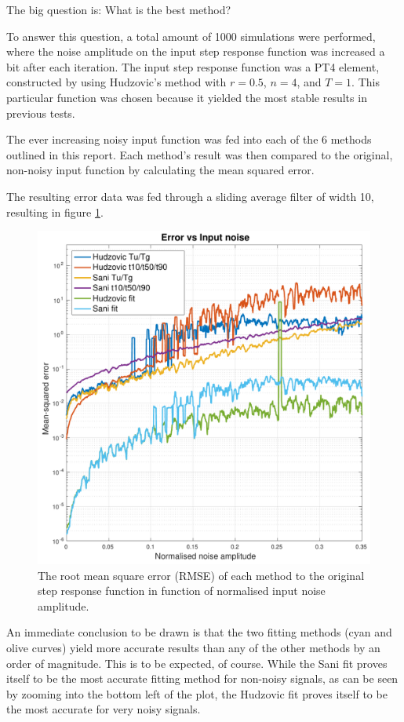 The big question is: What is the best method?

To answer this question, a  total  amount  of  1000  simulations were performed,
where the noise amplitude  on  the  input step response function was increased a
bit after each iteration. The input step response  function  was  a PT4 element,
constructed  by using Hudzovic's method with $r=0.5$,  $n=4$,  and  $T=1$.  This
particular function was chosen because it yielded the  most  stable  results  in
previous tests.

The ever  increasing  noisy  input  function  was fed into each of the 6 methods
outlined in this report. Each method's result was then compared to the original,
non-noisy input function by calculating the mean squared error.

The resulting error data was fed through a sliding average filter of  width  10,
resulting in figure \ref{fig:error_noise}.

\begin{figure}
    \includegraphics[width=\linewidth]{images/error_noise}
    \caption{The root mean square error (RMSE) of each method to the original step response function in function of normalised input noise amplitude.}
    \label{fig:error_noise}
\end{figure}

An  immediate  conclusion  to be drawn is that the two fitting methods (cyan and
olive curves) yield more accurate results than any  of  the  other methods by an
order of magnitude. This is to be expected, of course. While the Sani fit proves
itself to be  the  most accurate fitting method for non-noisy signals, as can be
seen by zooming into the bottom left of the plot, the Hudzovic fit proves itself
to be the most accurate for very noisy signals.

